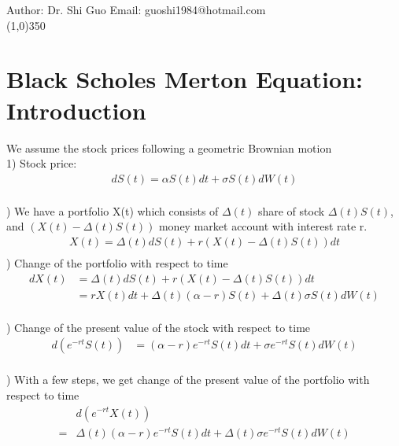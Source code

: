 \documentclass[a4paper]{article}
\begin{document}
Author: Dr. Shi Guo  \hspace{30mm} Email: guoshi1984@hotmail.com\\
\line(1,0){350}
\section{Black Scholes Merton Equation: Introduction}
We assume the stock prices following a geometric Brownian motion\\
1) Stock price:\\
\begin{align*}
	 dS(t) = \alpha S(t) dt + \sigma S(t) dW(t)\\
\end{align*}
 
) We have a portfolio X(t) which consists of $\Delta(t)$ share of stock  $\Delta(t) S(t)$, and $(X(t) - \Delta (t) S(t))$ money market account with interest rate r. \\  
\begin{align*}
	X(t) = \Delta(t) dS(t) + r(X(t) -\Delta(t) S(t)) dt\\
\end{align*}
) Change of the portfolio with respect to time
\begin{align*}
	  d X(t) & = \Delta(t) d S(t) + r(X(t) - \Delta(t) S(t)) dt \\
             & = r X(t) dt + \Delta(t) (\alpha - r )S(t) + \Delta (t) \sigma S(t) d W(t) \\
\end{align*}
                      
) Change of the present value of the stock with respect to time\\
\begin{align*}
	d(e^{-r t} S(t)) & = (\alpha - r) e^{- r t}S(t) dt + \sigma e^{- r t} S(t) dW(t) \\
\end{align*}

) With a few steps, we get change of the present value of the portfolio with respect to time\\
\begin{align*}
 & d(e^{- r t} X(t)) \\
 = & \Delta(t) (\alpha - r) e^{-rt} S(t) dt + \Delta(t) \sigma e^{-rt} S(t) dW(t)\\
\end{align*}
\end{document}
